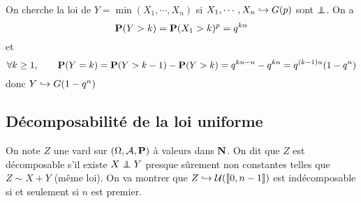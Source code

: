 On cherche la loi de $Y=\min(X_1,\cdots ,X_n)$ si $X_1,\cdots ,X_n\suit G(p)$ sont $\indep$. On a  \[
    \P(Y>k)=\P(X_1>k)^p=q^{kn}
\]
et \[
    \forall  k\geq 1, \qquad  \P(Y=k)=\P(Y>k-1)-\P(Y>k)=q^{kn-n}-q^{kn}=q^{(k-1)n}(1-q^n)
\] 
donc $Y\suit G(1-q^n)$ 

\subsection{Décomposabilité de la loi uniforme}

On note $Z$ une vard sur  $(\Omega, \mathcal A, \P)$ à valeurs dans $\N$. On dit que $Z$ est décomposable s'il existe  $X\indep Y$ presque sûrement non constantes telles que  $Z\sim X+Y$ (même loi). On va montrer que  $Z\suit \mathcal  U(\llbracket 0,n-1 \rrbracket )$ est indécomposable si et seulement si $n$ est premier.

